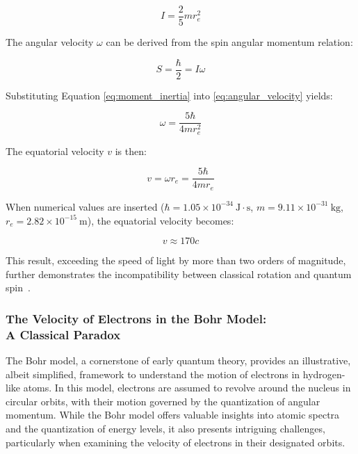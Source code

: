 \documentclass[%
 reprint,
 amsmath,amssymb,
 aps,
]{revtex4-1}
\numberwithin{equation}{section}%
\begin{document}
\begin{equation}
\label{eq:moment_inertia}
I = \frac{2}{5}mr_e^2
\end{equation}

The angular velocity $\omega$ can be derived from the spin angular momentum relation:

\begin{equation}
\label{eq:angular_velocity}
S = \frac{\hbar}{2} = I\omega
\end{equation}

Substituting Equation \ref{eq:moment_inertia} into \ref{eq:angular_velocity} yields:

\begin{equation}
\label{eq:omega_calc}
\omega = \frac{5\hbar}{4mr_e^2}
\end{equation}

The equatorial velocity $v$ is then:

\begin{equation}
\label{eq:equatorial_velocity}
v = \omega r_e = \frac{5\hbar}{4mr_e}
\end{equation}

When numerical values are inserted ($\hbar = 1.05 \times 10^{-34}~\mathrm{J \cdot s}$, $m = 9.11 \times 10^{-31}~\mathrm{kg}$, $r_e = 2.82 \times 10^{-15}~\mathrm{m}$), the equatorial velocity becomes:

\begin{equation}
\label{eq:velocity_result_corrected}
v \approx 170c
\end{equation}

This result, exceeding the speed of light by more than two orders of magnitude, further demonstrates the incompatibility between classical rotation and quantum spin~\cite{Ohanian1986}.


\subsubsection{The Velocity of Electrons in the Bohr Model:\\ A Classical Paradox}
\label{subsec:bohr_velocity}

The Bohr model, a cornerstone of early quantum theory, provides an illustrative, albeit simplified, framework to understand the motion of electrons in hydrogen-like atoms. In this model, electrons are assumed to revolve around the nucleus in circular orbits, with their motion governed by the quantization of angular momentum. While the Bohr model offers valuable insights into atomic spectra and the quantization of energy levels, it also presents intriguing challenges, particularly when examining the velocity of electrons in their designated orbits.
\end{document}
